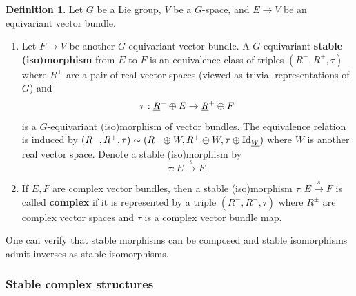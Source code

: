 \documentclass[reqno, 10pt]{amsart}
\numberwithin{equation}{section}
\numberwithin{equation}{section}
\theoremstyle{definition}
\newtheorem{defn}[thm]{Definition}
\theoremstyle{remark}
\newcommand{\beqn}{\begin{equation*}}
\newcommand{\eeqn}{\end{equation*}}
\newcommand{\uds}[1]{\underline{\smash{#1}}}
\begin{document}
\begin{defn}\label{defn_stable_isomorphism}
Let $G$ be a Lie group, $V$ be a $G$-space, and $E \to V$ be an equivariant vector bundle. 

\begin{enumerate}

\item Let $F \to V$ be another $G$-equivariant vector bundle. A $G$-equivariant {\bf stable (iso)morphism}  from $E$ to $F$ is an equivalence class of triples $(R^-, R^+, \tau)$ where $R^\pm$ are a pair of real vector spaces (viewed as trivial representations of $G$) and 
\beqn
\tau: \uds R^- \oplus E \to \uds R^+ \oplus F
\eeqn
is a $G$-equivariant (iso)morphism of vector bundles. The equivalence relation is induced by $(R^-, R^+, \tau) \sim (R^- \oplus W, R^+ \oplus W, \tau \oplus {\rm Id}_{\uds W})$ where $W$ is another real vector space. Denote a stable (iso)morphism by 
\beqn
\tau: E \overset{s}{\to} F.
\eeqn

\item If $E, F$ are complex vector bundles, then a stable (iso)morphism $\tau: E \overset{s}{\to} F$ is called {\bf complex} if it is represented by a triple $(R^-, R^+, \tau)$ where $R^\pm$ are complex vector spaces and $\tau$ is a complex vector bundle map. 

\end{enumerate}
\end{defn}

One can verify that stable morphisms can be composed and stable isomorphisms admit inverses as stable isomorphisms. 

\subsubsection{Stable complex structures}
\end{document}
